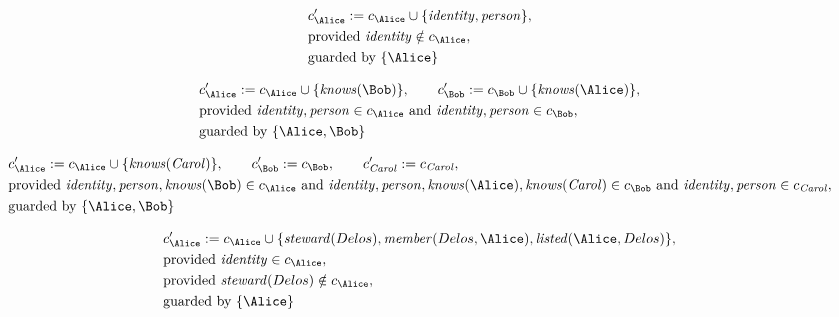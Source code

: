 \begin{align*}
&
c'_
{
\Alice
}
 := 
c_
{
\Alice
}
 \cup 
\{
\mathit{\detokenize{
identity
}}
,
\mathit{\detokenize{
person
}}
\}
,\\
&
\text{provided } 
\mathit{\detokenize{
identity
}}
 \notin c_
{
\Alice
}
,\\
&
\text{guarded by } \{
\Alice
\}
\end{align*}

\begin{align*}
&
c'_
{
\Alice
}
 := 
c_
{
\Alice
}
 \cup 
\{
\mathit{\detokenize{
knows
}}
(
\Bob
)
\}
, \qquad 
c'_
{
\Bob
}
 := 
c_
{
\Bob
}
 \cup 
\{
\mathit{\detokenize{
knows
}}
(
\Alice
)
\}
,\\
&
\text{provided } 
\mathit{\detokenize{
identity
}}
,
\mathit{\detokenize{
person
}}
 \in c_
{
\Alice
}
 \text{ and } 
\mathit{\detokenize{
identity
}}
,
\mathit{\detokenize{
person
}}
 \in c_
{
\Bob
}
,\\
&
\text{guarded by } \{
\Alice
,
\Bob
\}
\end{align*}

\begin{align*}
&
c'_
{
\Alice
}
 := 
c_
{
\Alice
}
 \cup 
\{
\mathit{\detokenize{
knows
}}
(
\mathit{Carol}
)
\}
, \qquad 
c'_
{
\Bob
}
 := 
c_
{
\Bob
}
, \qquad 
c'_
{
\mathit{Carol}
}
 := 
c_
{
\mathit{Carol}
}
,\\
&
\text{provided } 
\mathit{\detokenize{
identity
}}
,
\mathit{\detokenize{
person
}}
,
\mathit{\detokenize{
knows
}}
(
\Bob
)
 \in c_
{
\Alice
}
 \text{ and } 
\mathit{\detokenize{
identity
}}
,
\mathit{\detokenize{
person
}}
,
\mathit{\detokenize{
knows
}}
(
\Alice
)
,
\mathit{\detokenize{
knows
}}
(
\mathit{Carol}
)
 \in c_
{
\Bob
}
 \text{ and } 
\mathit{\detokenize{
identity
}}
,
\mathit{\detokenize{
person
}}
 \in c_
{
\mathit{Carol}
}
,\\
&
\text{guarded by } \{
\Alice
,
\Bob
\}
\end{align*}

\begin{align*}
&
c'_
{
\Alice
}
 := 
c_
{
\Alice
}
 \cup 
\{
\mathit{\detokenize{
steward
}}
(
Delos
)
,
\mathit{\detokenize{
member
}}
(
Delos
,
\Alice
)
,
\mathit{\detokenize{
listed
}}
(
\Alice
,
Delos
)
\}
,\\
&
\text{provided } 
\mathit{\detokenize{
identity
}}
 \in c_
{
\Alice
}
,\\
&
\text{provided } 
\mathit{\detokenize{
steward
}}
(
Delos
)
 \notin c_
{
\Alice
}
,\\
&
\text{guarded by } \{
\Alice
\}
\end{align*}
